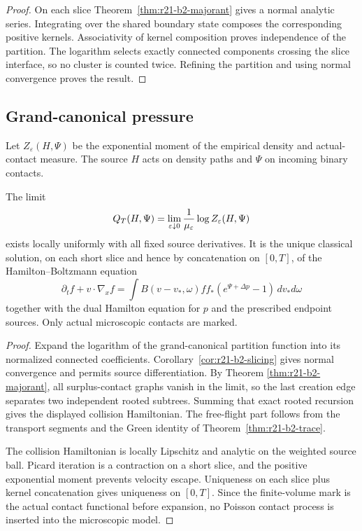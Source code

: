 \begin{proof}
On each slice Theorem~\ref{thm:r21-b2-majorant} gives a normal analytic series.
Integrating over the shared boundary state composes the corresponding positive
kernels.  Associativity of kernel composition proves independence of the
partition.  The logarithm selects exactly connected components crossing the
slice interface, so no cluster is counted twice.  Refining the partition and
using normal convergence proves the result.
\end{proof}

\subsection{Grand-canonical pressure}

Let $Z_\varepsilon(H,\Psi)$ be the exponential moment of the empirical density
and actual-contact measure.  The source $H$ acts on density paths and $\Psi$
on incoming binary contacts.

\begin{theorem}
\label{thm:r21-b2-pressure}
The limit
\[
 Q_T(H,\Psi)=\lim_{\varepsilon\downarrow0}
 {1\over\mu_\varepsilon}\log Z_\varepsilon(H,\Psi)
\]
exists locally uniformly with all fixed source derivatives.  It is the unique
classical solution, on each short slice and hence by concatenation on
$[0,T]$, of the Hamilton--Boltzmann equation
\[
 \partial_t f+v\cdot\nabla_xf
 =\int B(v-v_*,\omega)ff_*
 \left(e^{\Psi+\Delta p}-1\right)
 \,dv_*d\omega
\]
together with the dual Hamilton equation for $p$ and the prescribed endpoint
sources.  Only actual microscopic contacts are marked.
\end{theorem}

\begin{proof}
Expand the logarithm of the grand-canonical partition function into its
normalized connected coefficients.  Corollary~\ref{cor:r21-b2-slicing}
gives normal convergence and permits source differentiation.  By Theorem
\ref{thm:r21-b2-majorant}, all surplus-contact graphs vanish in the limit, so
the last creation edge separates two independent rooted subtrees.  Summing
that exact rooted recursion gives the displayed collision Hamiltonian.
The free-flight part follows from the transport segments and the Green
identity of Theorem~\ref{thm:r21-b2-trace}.

The collision Hamiltonian is locally Lipschitz and analytic on the weighted
source ball.  Picard iteration is a contraction on a short slice, and the
positive exponential moment prevents velocity escape.  Uniqueness on each
slice plus kernel concatenation gives uniqueness on $[0,T]$.  Since the
finite-volume mark is the actual contact functional before expansion, no
Poisson contact process is inserted into the microscopic model.
\end{proof}

